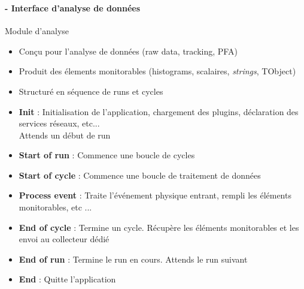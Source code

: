 \documentclass[8pt]{beamer}
\begin{document}
  
  \begin{frame}
  \frametitle{\secname}
  \framesubtitle{\subsecname - Interface d'analyse de données}    
    \begin{minipage}{0.79\textwidth}
      \begin{block}{Module d'analyse}
        \begin{itemize}
          \item Conçu pour l'analyse de données (raw data, tracking, PFA)
          \item Produit des élements monitorables (histograms, scalaires, \textit{strings}, TObject)
          \item Structuré en séquence de runs et cycles
        \end{itemize}
      \end{block}
      \begin{itemize}
        \item \textbf{Init} : Initialisation de l'application, chargement des plugins, déclaration des services réseaux, etc...\\
        Attends un début de run
        \item \textbf{Start of run} : Commence une boucle de cycles
        \item \textbf{Start of cycle} : Commence une boucle de traitement de données
        \item \textbf{Process event} : Traite l’événement physique entrant, rempli les éléments monitorables, etc ...
        \item \textbf{End of cycle} : Termine un cycle. Récupère les éléments monitorables et les envoi au collecteur dédié
        \item \textbf{End of run} : Termine le run en cours. Attends le run suivant
        \item \textbf{End} : Quitte l'application
      \end{itemize}
    \end{minipage} \hfill
    \begin{minipage}{0.18\textwidth}
      \begin{flushright}
\end{flushright}
\end{minipage}
\end{frame}
\end{document}
